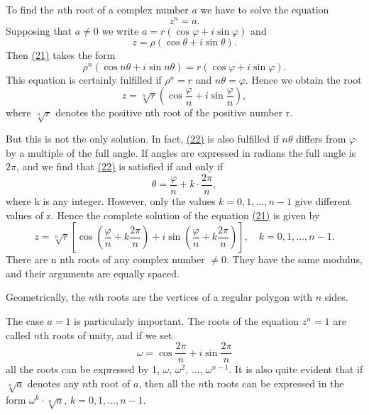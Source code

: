 To find the $n$th root of a complex number $a$ we have to solve the equation
\begin{equation*}
z ^ {n} = a.\tag{21}\label{eq:1.21}
\end{equation*}
Supposing that $a \neq 0$ we write $a = r(\cos \varphi + i \sin \varphi)$ and
\begin{equation*}
z = \rho (\cos \theta + i \sin \theta).
\end{equation*}
Then \hyperref[eq:1.21]{(21)} takes the form
\begin{equation*}
\rho^ {n} (\cos n \theta + i \sin n \theta) = r (\cos \varphi + i \sin \varphi).\tag{22}\label{eq:1.22}
\end{equation*}
This equation is certainly fulfilled if $\rho^{n}=r$ and $n\theta=\varphi$. Hence we obtain the root
\begin{equation*}
z = \sqrt [ n ]{r} \left(\cos \frac {\varphi}{n} + i \sin \frac {\varphi}{n}\right),
\end{equation*}
where $\sqrt[n]{r}$ denotes the positive nth root of the positive number r.

But this is not the only solution. In fact, \hyperref[eq:1.22]{(22)} is also fulfilled if $n\theta$ differs from $\varphi$ by a multiple of the full angle. If angles are expressed in radians the full angle is $2\pi$, and we find that \hyperref[eq:1.22]{(22)} is satisfied if and only if
\begin{equation*}
\theta = \frac {\varphi}{n} + k \cdot \frac {2 \pi}{n},
\end{equation*}
where k is any integer. However, only the values $k = 0, 1, \ldots, n - 1$ give different values of z. Hence the complete solution of the equation \hyperref[eq:1.21]{(21)} is given by
\begin{equation*}
z = \sqrt [ n ]{r} \left[ \cos \left(\frac {\varphi}{n} + k \frac {2 \pi}{n}\right) + i \sin \left(\frac {\varphi}{n} + k \frac {2 \pi}{n}\right) \right], \quad k = 0, 1, \dots , n - 1.
\end{equation*}
There are n nth roots of any complex number $\neq 0$. They have the same modulus, and their arguments are equally spaced.

Geometrically, the $n$th roots are the vertices of a regular polygon with $n$ sides.

The case $a = 1$ is particularly important. The roots of the equation $z^n = 1$ are called $n$th roots of unity, and if we set
\begin{equation*}
\omega = \cos {\frac {2 \pi}{n}} + i \sin {\frac {2 \pi}{n}}\tag{23}\label{eq:1.23}
\end{equation*}
all the roots can be expressed by 1, $\omega$, $\omega^2$, $\ldots$, $\omega^{n-1}$. It is also quite evident that if $\sqrt[n]{a}$ denotes any $n$th root of $a$, then all the $n$th roots can be expressed in the form $\omega^k \cdot \sqrt[n]{a}$, $k = 0, 1, \ldots, n - 1$.

